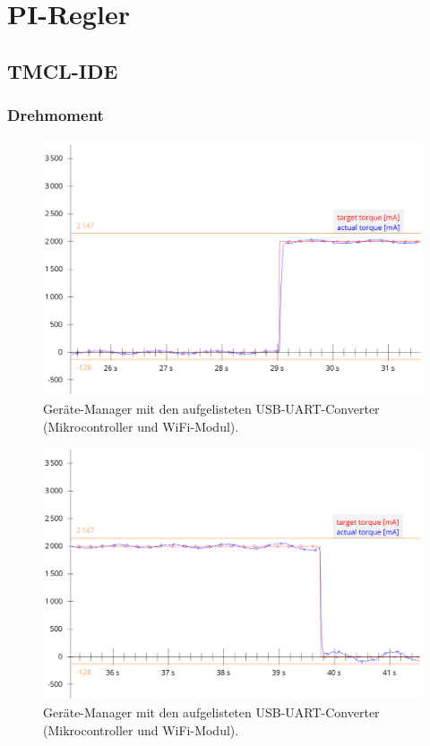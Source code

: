 \section{PI-Regler}

\subsection{TMCL-IDE}

\subsubsection{Drehmoment}\label{Appendix:PI_Torque}

\begin{figure}[H]
\center
\includegraphics[width = \textwidth]{graphics/PI_Torque_Graph_0}
\caption{Geräte-Manager mit den aufgelisteten USB-UART-Converter (Mikrocontroller und WiFi-Modul).}
\label{fig:PI_Torque_Graph_0}
\end{figure}

\begin{figure}[H]
\center
\includegraphics[width = \textwidth]{graphics/PI_Torque_Graph_1}
\caption{Geräte-Manager mit den aufgelisteten USB-UART-Converter (Mikrocontroller und WiFi-Modul).}
\label{fig:PI_Torque_Graph_1}
\end{figure}

